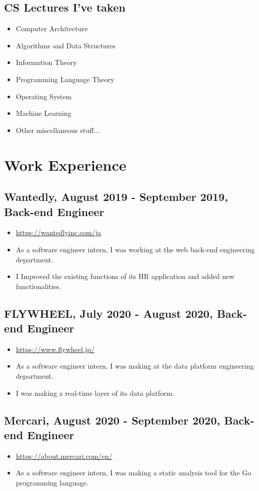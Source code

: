 \documentclass{article}
\begin{document}
  \subsection*{CS Lectures I've taken}
    \begin{itemize}
      \item Computer Architecture
      \item Algorithms and Data Structures
      \item Information Theory
      \item Programming Language Theory
      \item Operating System
      \item Machine Learning
      \item Other miscellaneous stuff...
    \end{itemize}

\section*{Work Experience}
  \subsection*{Wantedly, August 2019 - September 2019, Back-end Engineer}
    \begin{itemize}
      \item \url{https://wantedlyinc.com/ja}
      \item As a software engineer intern, I was working at the web back-end engineering department.
      \item I Improved the existing functions of its HR application and added new functionalities.
    \end{itemize}

  \subsection*{FLYWHEEL, July 2020 - August 2020, Back-end Engineer}
    \begin{itemize}
      \item \url{https://www.flywheel.jp/}
      \item As a software engineer intern, I was making at the data platform engineering department.
      \item I was making a real-time layer of its data platform.
    \end{itemize}

  \subsection*{Mercari, August 2020 - September 2020, Back-end Engineer}
    \begin{itemize}
      \item \url{https://about.mercari.com/en/}
      \item As a software engineer intern, I was making a static analysis tool for the Go programming language.
    \end{itemize}
\end{document}
